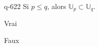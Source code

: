 \begin{truefalse}{q-622}
Si $p\leq q$, alors $\mathbb U_p \subset  \mathbb U_q$.
\item Vrai
\item* Faux
\end{truefalse}

